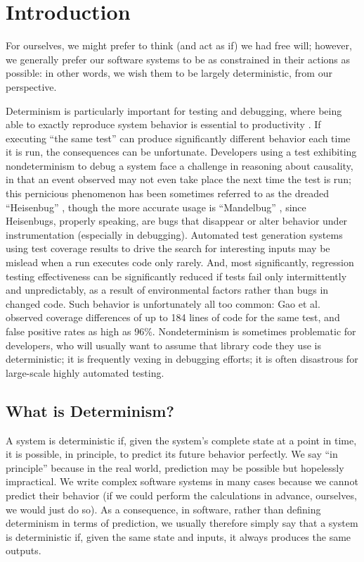 \section{Introduction}

For ourselves, we might prefer to think (and act as if) we had free
will; however, we generally prefer our software systems to be as
constrained in their actions as possible:  in other words, we wish
them to be largely deterministic, from our perspective.

Determinism is particularly important for testing and debugging, where
being able to exactly reproduce system behavior is essential to
productivity \cite{Firesmith}.  If executing ``the same test'' can produce
significantly different behavior each time it is run, the consequences
can be unfortunate.  Developers using a test exhibiting nondeterminism
to debug a system
face a challenge in reasoning about causality, in that an event
observed may not even take place the next time the test is run; this
pernicious phenomenon has been sometimes referred to as the dreaded
``Heisenbug'' \cite{Heisenbug}, though the more accurate usage is
``Mandelbug'' \cite{GrottkeBugs,FaultTriggers}, since Heisenbugs, properly speaking, are bugs that disappear or
alter behavior under instrumentation (especially in debugging).
Automated test generation systems using test coverage results to drive
the search for interesting inputs may be mislead when a run executes
code only rarely.  And, most significantly, regression testing
effectiveness can be significantly reduced if tests fail only
intermittently and unpredictably, as a result of environmental
factors rather than bugs in changed code.  Such behavior is
unfortunately all too common:  Gao et
al. \cite{Gao:2015:MSU:2818754.2818764} observed coverage differences
of up to 184 lines of code for the same test, and false positive rates
as high as 96\%.  Nondeterminism is sometimes problematic for
developers, who will usually want to  assume that library code they
use is deterministic; it is frequently vexing in debugging efforts; it is often disastrous for large-scale highly
automated testing.


\subsection{What is Determinism?}

A system is deterministic if, given the system's complete state at a point in
time, it is possible, in principle, to predict its future behavior
perfectly.  We say ``in principle'' because in the real world,
prediction may be possible but hopelessly impractical.  We write
complex software systems in many cases because we cannot predict their
behavior (if we could perform the calculations in advance, ourselves,
we would just do so).  As a consequence, in software, rather than
defining determinism in terms of prediction, we usually therefore
simply say that a system is deterministic if, given the same state and
inputs, it always produces the same outputs.  

